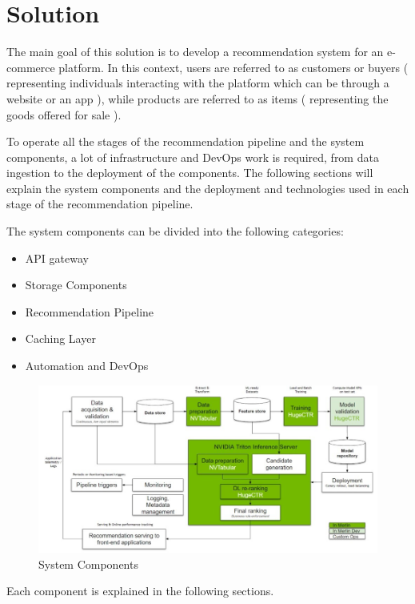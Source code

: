 \chapter{Solution}
\minitoc

The main goal of this solution is to develop a recommendation system for an e-commerce platform. 
In this context, users are referred to as customers or buyers ( representing individuals interacting with the platform which can be through a website or an app ), 
while products are referred to as items ( representing the goods offered for sale ).

To operate all the stages of the recommendation pipeline and the system components, 
a lot of infrastructure and DevOps work is required, from data ingestion to the deployment of the components.
The following sections will explain the system components and the deployment and technologies used in each stage of the recommendation pipeline.

The system components can be divided into the following categories:
\begin{itemize}
    \item API gateway
    \item Storage Components
    \item Recommendation Pipeline
    \item Caching Layer
    \item Automation and DevOps
\end{itemize}

\begin{figure}[H]
    \centering
    \includegraphics[width=1\textwidth]{assets/components.jpeg}
    \caption[System Components]{System Components \cite{NvidiaRecSysBestPractices}}
\end{figure}

Each component is explained in the following sections.

